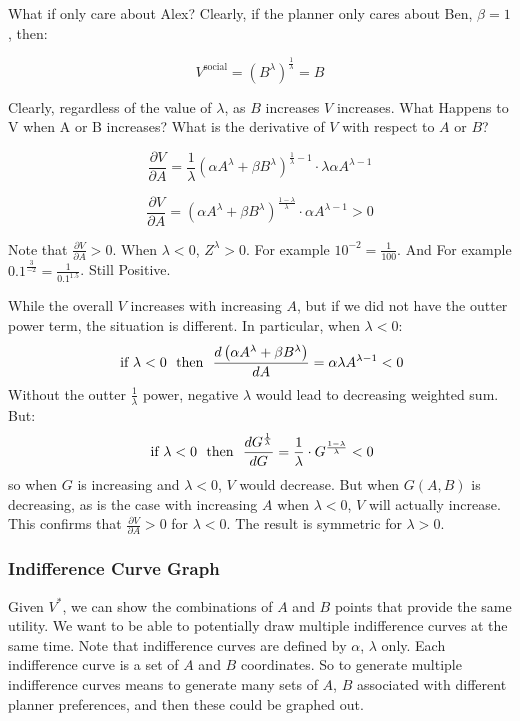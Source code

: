 \documentclass[
]{book}
\begin{document}
What if only care about Alex? Clearly, if the planner only cares about Ben, \(\beta=1\), then:

\[
V^{\text{social}}
=
\left(
B^{\lambda}
\right)^{\frac{1}{\lambda}}
= B
\]

Clearly, regardless of the value of \(\lambda\), as \(B\) increases \(V\) increases. What Happens to V when A or B increases? What is the derivative of \(V\) with respect to \(A\) or \(B\)?

\[
    \frac{\partial V}{\partial A}
    =
    \frac{1}{\lambda}
    \left(
    \alpha
    A^{\lambda}
    +
    \beta
    B^{\lambda}
    \right)^{\frac{1}{\lambda}-1}
    \cdot
    \lambda
    \alpha
    A^{\lambda -1}
\]

\[
    \frac{\partial V}{\partial A}
    =
    \left(
    \alpha
    A^{\lambda}
    +
    \beta
    B^{\lambda}
    \right)^{\frac{1-\lambda}{\lambda}}
    \cdot
    \alpha
    A^{\lambda -1}
    >0
\]

Note that \(\frac{\partial V}{\partial A}>0\). When \(\lambda <0\), \(Z^{\lambda}>0\). For example \(10^{-2}=\frac{1}{100}\). And For example \(0.1^{\frac{3}{-2}}=\frac{1}{0.1^{1.5}}\). Still Positive.

While the overall \(V\) increases with increasing \(A\), but if we did not have the outter power term, the situation is different. In particular, when \(\lambda < 0\):
\[
\text{ if } \lambda <0
\thinspace\thinspace
\text{ then }
\thinspace\thinspace
\frac{d \left(\alpha A^{\lambda} + \beta B^{\lambda}\right)}{dA}=\alpha\lambda A^{\lambda -1}<0
\]
Without the outter \(\frac{1}{\lambda}\) power, negative \(\lambda\) would lead to decreasing weighted sum. But:
\[
\text{ if } \lambda <0
\thinspace\thinspace
\text{ then }
\thinspace\thinspace
\frac{dG^{\frac{1}{\lambda}}}{dG}=\frac{1}{\lambda}\cdot G^{\frac{1-\lambda}{\lambda}}<0
\]
so when \(G\) is increasing and \(\lambda <0\), \(V\) would decrease. But when \(G\left(A,B\right)\) is decreasing, as is the case with increasing \(A\) when \(\lambda <0\), \(V\) will actually increase. This confirms that \(\frac{\partial V}{\partial A}>0\) for \(\lambda <0\). The result is symmetric for \(\lambda >0\).

\hypertarget{indifference-curve-graph}{%
\subsubsection{Indifference Curve Graph}\label{indifference-curve-graph}}

Given \(V^{\ast}\), we can show the combinations of \(A\) and \(B\) points that provide the same utility. We want to be able to potentially draw multiple indifference curves at the same time. Note that indifference curves are defined by \(\alpha\), \(\lambda\) only. Each indifference curve is a set of \(A\) and \(B\) coordinates. So to generate multiple indifference curves means to generate many sets of \(A\), \(B\) associated with different planner preferences, and then these could be graphed out.
\end{document}
